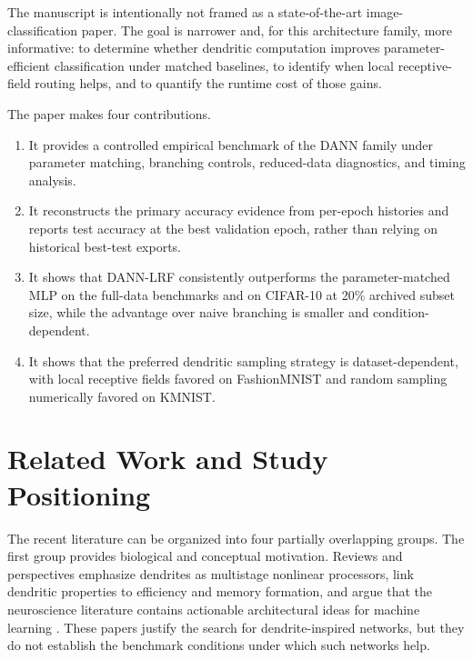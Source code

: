 \documentclass[preprint,12pt]{elsarticle}
\newcommand{\DANNLRF}{\textsc{DANN-LRF}}
\begin{document}
The manuscript is intentionally not framed as a state-of-the-art image-classification paper. The goal is narrower and, for this architecture family, more informative: to determine whether dendritic computation improves parameter-efficient classification under matched baselines, to identify when local receptive-field routing helps, and to quantify the runtime cost of those gains.

The paper makes four contributions.
\begin{enumerate}
\item It provides a controlled empirical benchmark of the DANN family under parameter matching, branching controls, reduced-data diagnostics, and timing analysis.
\item It reconstructs the primary accuracy evidence from per-epoch histories and reports test accuracy at the best validation epoch, rather than relying on historical best-test exports.
\item It shows that \DANNLRF{} consistently outperforms the parameter-matched MLP on the full-data benchmarks and on CIFAR-10 at 20\% archived subset size, while the advantage over naive branching is smaller and condition-dependent.
\item It shows that the preferred dendritic sampling strategy is dataset-dependent, with local receptive fields favored on FashionMNIST and random sampling numerically favored on KMNIST.
\end{enumerate}

\section{Related Work and Study Positioning}
\label{sec:related}

The recent literature can be organized into four partially overlapping groups. The first group provides biological and conceptual motivation. Reviews and perspectives emphasize dendrites as multistage nonlinear processors, link dendritic properties to efficiency and memory formation, and argue that the neuroscience literature contains actionable architectural ideas for machine learning \cite{poirazi2003two,london2005dendritic,stuart2015dendritic,deschutter2018deepcs,ashhad2018stores,larkum2018perspective,chavlis2021drawing,acharya2022dendriticcomputing,sinha2022active,kastellakis2023engram,makarov2023efficiency,pagkalos2024leveraging,chavlis2025parameter}. These papers justify the search for dendrite-inspired networks, but they do not establish the benchmark conditions under which such networks help.
\end{document}
